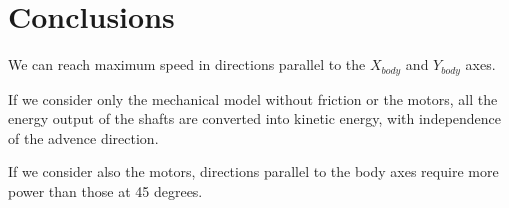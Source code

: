 \documentclass[12pt]{article}
\newcounter{lastnote}
\newenvironment{scilastnote}{%
\setcounter{lastnote}{\value{enumiv}}%
\addtocounter{lastnote}{+1}%
\begin{list}%
{\arabic{lastnote}.}
{\setlength{\leftmargin}{.22in}}
{\setlength{\labelsep}{.5em}}}
{\end{list}}
\begin{document}
\section*{Conclusions}

We can reach maximum speed in directions parallel to the $X_{body}$ and $Y_{body}$ axes.

If we consider only the mechanical model without friction or the motors, all the energy output of the shafts are converted into kinetic energy, with independence of the advence direction.

If we consider also the motors, directions parallel to the body axes require more power than those at 45 degrees.


%

%











\end{document}
